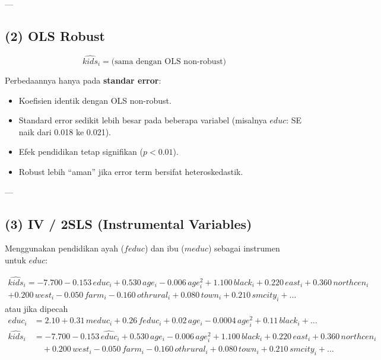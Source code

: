 \documentclass[]{article}
\begin{document}
---

\subsection*{(2) OLS Robust}

\begin{equation}
\hat{kids}_i = \text{(sama dengan OLS non-robust)} 
\end{equation}

Perbedaannya hanya pada \textbf{standar error}:
\begin{itemize}
    \item Koefisien identik dengan OLS non-robust.
    \item Standard error sedikit lebih besar pada beberapa variabel (misalnya $educ$: SE naik dari 0.018 ke 0.021).
    \item Efek pendidikan tetap signifikan ($p < 0.01$).
    \item Robust lebih ``aman'' jika error term bersifat heteroskedastik.
\end{itemize}

---

\subsection*{(3) IV / 2SLS (Instrumental Variables)}

Menggunakan pendidikan ayah ($feduc$) dan ibu ($meduc$) sebagai instrumen untuk $educ$:

\begin{equation}
\begin{split}
\hat{kids}_i = -7.700 - 0.153\,educ_i + 0.530\,age_i - 0.006\,age_i^2 
              + 1.100\,black_i + 0.220\,east_i + 0.360\,northcen_i \\
              + 0.200\,west_i - 0.050\,farm_i - 0.160\,othrural_i 
              + 0.080\,town_i + 0.210\,smcity_i + \ldots
\end{split}
\end{equation}
 atau jika dipecah
\begin{equation}
\begin{aligned}
educ_i &= 2.10 + 0.31\,meduc_i + 0.26\,feduc_i + 0.02\,age_i - 0.0004\,age_i^2 
        + 0.11\,black_i + \ldots \\[6pt]
\hat{kids}_i &= -7.700 - 0.153\,\hat{educ}_i + 0.530\,age_i - 0.006\,age_i^2 
              + 1.100\,black_i + 0.220\,east_i + 0.360\,northcen_i \\
             &\quad + 0.200\,west_i - 0.050\,farm_i - 0.160\,othrural_i 
              + 0.080\,town_i + 0.210\,smcity_i + \ldots
\end{aligned}
\end{equation}
\end{document}
